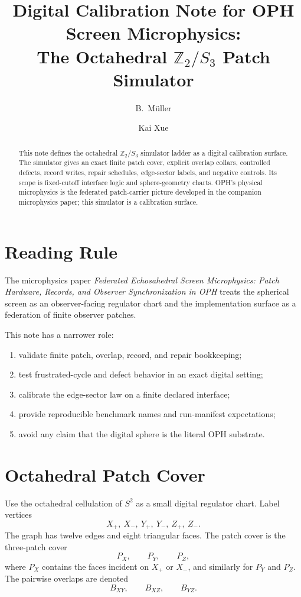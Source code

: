 \documentclass[11pt]{article}
\title{Digital Calibration Note for OPH Screen Microphysics:\\
The Octahedral \(\mathbb Z_2/S_3\) Patch Simulator}
\author{B.\ M\"uller \and Kai Xue}
\date{\OPHPaperReleaseDate}
\begin{document}
\maketitle
\OPHPaperReleaseBanner

\begin{abstract}
This note defines the octahedral \(\mathbb Z_2/S_3\) simulator ladder as a digital calibration
surface. The simulator gives an exact finite patch cover, explicit overlap collars, controlled
defects, record writes, repair schedules, edge-sector labels, and negative controls. Its scope is
fixed-cutoff interface logic and sphere-geometry charts. OPH's physical microphysics is the
federated patch-carrier picture developed in the companion microphysics paper; this simulator is a
calibration surface.
\end{abstract}

\section{Reading Rule}

The microphysics paper
\emph{Federated Echosahedral Screen Microphysics: Patch Hardware, Records, and Observer
Synchronization in OPH} treats the spherical screen as an observer-facing regulator chart and
the implementation surface as a federation of finite observer patches.

This note has a narrower role:
\begin{enumerate}[leftmargin=2em]
\item validate finite patch, overlap, record, and repair bookkeeping;
\item test frustrated-cycle and defect behavior in an exact digital setting;
\item calibrate the edge-sector law on a finite declared interface;
\item provide reproducible benchmark names and run-manifest expectations;
\item avoid any claim that the digital sphere is the literal OPH substrate.
\end{enumerate}

\section{Octahedral Patch Cover}

Use the octahedral cellulation of \(S^2\) as a small digital regulator chart. Label vertices
\[
X_+,\ X_-,\ Y_+,\ Y_-,\ Z_+,\ Z_-.
\]
The graph has twelve edges and eight triangular faces. The patch cover is the three-patch cover
\[
P_X,\qquad P_Y,\qquad P_Z,
\]
where \(P_X\) contains the faces incident on \(X_+\) or \(X_-\), and similarly for \(P_Y\) and
\(P_Z\). The pairwise overlaps are denoted
\[
B_{XY},\qquad B_{XZ},\qquad B_{YZ}.
\]
\end{document}
